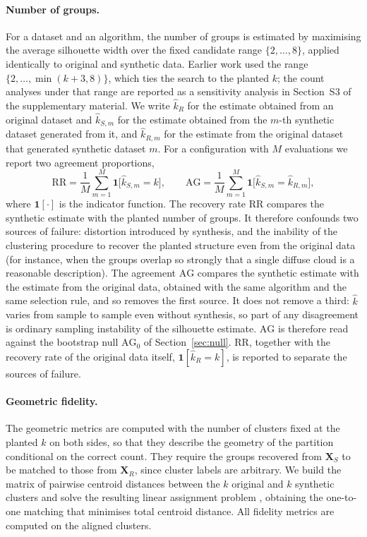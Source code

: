 \documentclass[pdflatex,referee]{sn-jnl}
\newcommand{\ind}{\mathbf{1}}
\newcommand{\bX}{\mathbf{X}}
\begin{document}
\paragraph{Number of groups.}
For a dataset and an algorithm, the number of groups is estimated by maximising
the average silhouette width \citep{rousseeuw1987} over the fixed candidate
range $\{2,\dots,8\}$, applied identically to original and synthetic data.
Earlier work \citep{chen2025} used the range $\{2,\dots,\min(k+3,8)\}$, which
ties the search to the planted $k$; the count analyses under that range are
reported as a sensitivity analysis in Section~S3 of the supplementary material.
We write $\hat{k}_R$ for the estimate obtained from an original dataset and
$\hat{k}_{S,m}$ for the estimate obtained from the $m$-th synthetic dataset
generated from it, and $\hat{k}_{R,m}$ for the estimate from the original
dataset that generated synthetic dataset $m$. For a configuration with $M$
evaluations we report two agreement proportions,
\begin{equation}
  \mathrm{RR} = \frac{1}{M} \sum_{m=1}^{M}
    \ind\bigl[\hat{k}_{S,m} = k\bigr],
  \qquad
  \mathrm{AG} = \frac{1}{M} \sum_{m=1}^{M}
    \ind\bigl[\hat{k}_{S,m} = \hat{k}_{R,m}\bigr],
  \label{eq:sr}
\end{equation}
where $\ind[\cdot]$ is the indicator function. The recovery rate $\mathrm{RR}$
compares the synthetic estimate with the planted number of groups. It
therefore confounds two sources of failure: distortion introduced by
synthesis, and the inability of the clustering procedure to recover the
planted structure even from the original data (for instance, when the groups
overlap so strongly that a single diffuse cloud is a reasonable description).
The agreement $\mathrm{AG}$ compares the synthetic estimate with the estimate
from the original data, obtained with the same algorithm and the same
selection rule, and so removes the first source. It does not remove a third:
$\hat{k}$ varies from sample to sample even without synthesis, so part of any
disagreement is ordinary sampling instability of the silhouette estimate.
$\mathrm{AG}$ is therefore read against the bootstrap null
$\mathrm{AG}_0$ of Section~\ref{sec:null}. $\mathrm{RR}$, together with the
recovery rate of the original data itself, $\ind[\hat{k}_R = k]$, is reported
to separate the sources of failure.

\paragraph{Geometric fidelity.}
The geometric metrics are computed with the number of clusters fixed at the
planted $k$ on both sides, so that they describe the geometry of the
partition conditional on the correct count. They require the groups recovered
from $\bX_S$ to be matched to those from $\bX_R$, since cluster labels are
arbitrary. We build the matrix of pairwise centroid distances between the $k$
original and $k$ synthetic clusters and solve the resulting linear assignment
problem \citep{kuhn1955}, obtaining the one-to-one matching that minimises
total centroid distance. All fidelity metrics are computed on the aligned
clusters.
\end{document}
